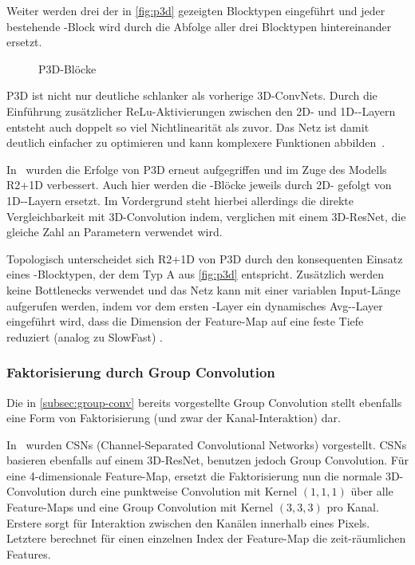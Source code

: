 Weiter werden drei der in \autoref{fig:p3d} gezeigten Blocktypen eingeführt und jeder bestehende \res-Block wird durch die Abfolge aller drei Blocktypen hintereinander ersetzt.

\begin{figure}[h!]
    \centering
    \caption{P3D-Blöcke}
    \label{fig:p3d}
\end{figure}

P3D ist nicht nur deutliche schlanker als vorherige 3D-ConvNets.
Durch die Einführung zusätzlicher ReLu-Aktivierungen zwischen den 2D- und 1D-\conv-Layern entsteht auch doppelt so viel Nichtlinearität als zuvor.
Das Netz ist damit deutlich einfacher zu optimieren und kann komplexere Funktionen abbilden~\cite{Tran18}.

In~\cite{Tran18} wurden die Erfolge von P3D erneut aufgegriffen und im Zuge des Modells R2+1D verbessert.
Auch hier werden die \res-Blöcke jeweils durch 2D- gefolgt von 1D-\conv-Layern ersetzt.
Im Vordergrund steht hierbei allerdings die direkte Vergleichbarkeit mit 3D-Convolution indem, verglichen mit einem 3D-ResNet, die gleiche Zahl an Parametern verwendet wird.

Topologisch unterscheidet sich R2+1D von P3D durch den konsequenten Einsatz eines \res-Blocktypen, der dem Typ A aus \autoref{fig:p3d} entspricht.
Zusätzlich werden keine Bottlenecks verwendet und das Netz kann mit einer variablen Input-Länge aufgerufen werden, indem vor dem ersten \fc-Layer ein dynamisches Avg-\pool-Layer eingeführt wird, dass die Dimension der Feature-Map auf eine feste Tiefe reduziert (analog zu SlowFast) .

\subsubsection{Faktorisierung durch Group Convolution}

Die in \autoref{subsec:group-conv} bereits vorgestellte Group Convolution stellt ebenfalls eine Form von Faktorisierung (und zwar der Kanal-Interaktion) dar.

In~\cite{Tran19} wurden CSNs (Channel-Separated Convolutional Networks) vorgestellt.
CSNs basieren ebenfalls auf einem 3D-ResNet, benutzen jedoch Group Convolution.
Für eine 4-dimensionale Feature-Map, ersetzt die Faktorisierung nun die normale 3D-Convolution durch eine punktweise Convolution mit Kernel $(1, 1, 1)$ über alle Feature-Maps und eine Group Convolution mit Kernel $(3, 3, 3)$ pro Kanal.
Erstere sorgt für Interaktion zwischen den Kanälen innerhalb eines Pixels.
Letztere berechnet für einen einzelnen Index der Feature-Map die zeit-räumlichen Features.

